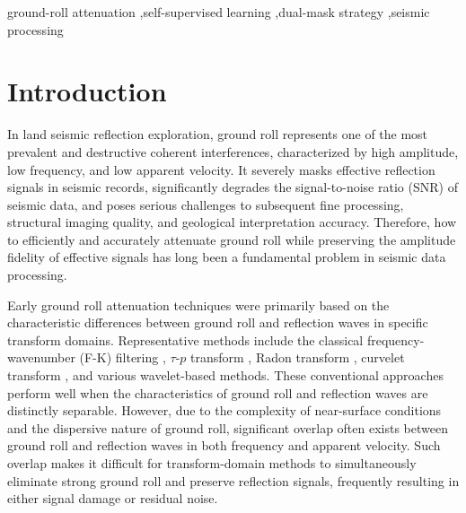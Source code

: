 \documentclass[a4paper,fleqn]{cas-dc}
\begin{document}
\begin{keywords}
ground-roll attenuation \sep self-supervised learning \sep dual-mask strategy \sep seismic processing
\end{keywords}

\maketitle
\section{Introduction}

In land seismic reflection exploration, ground roll represents one of the most prevalent and 
destructive coherent interferences, characterized by high amplitude, low frequency, and low 
apparent velocity. It severely masks effective reflection signals in seismic records, 
significantly degrades the signal-to-noise ratio (SNR) of seismic data, and poses serious 
challenges to subsequent fine processing, structural imaging quality, and geological 
interpretation accuracy. Therefore, how to efficiently and accurately attenuate ground roll 
while preserving the amplitude fidelity of effective signals has long been a fundamental 
problem in seismic data processing.

Early ground roll attenuation techniques were primarily based on the characteristic differences 
between ground roll and reflection waves in specific transform domains. Representative methods 
include the classical frequency-wavenumber (F-K) filtering \citep{hosseini2015shearlet, 
chen2014random}, $\tau$-$p$ transform \citep{mitchell1990efficient}, Radon transform 
\citep{naghadeh2021retrieving}, curvelet transform \citep{yuan2018ground, wang2021ground, 
naghizadeh2018ground}, and various wavelet-based methods. These conventional approaches 
perform well when the characteristics of ground roll and reflection waves are distinctly 
separable. However, due to the complexity of near-surface conditions and the dispersive 
nature of ground roll, significant overlap often exists between ground roll and reflection 
waves in both frequency and apparent velocity. Such overlap makes it difficult for 
transform-domain methods to simultaneously eliminate strong ground roll and preserve 
reflection signals, frequently resulting in either signal damage or residual noise.
\end{document}
